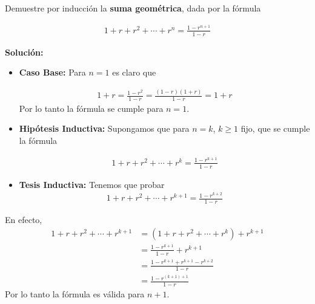 \documentclass[12pt]{book}
\begin{document}
\begin{prob}{}{}
Demuestre por inducción la \textbf{suma geométrica}, dada por la fórmula

\begin{align*}
    1+r+r^2+\cdots+r^n=\frac{1-r^{n+1}}{1-r}
\end{align*}    
\end{prob}
\textbf{Solución:}
\begin{itemize}
    \item \textbf{Caso Base:} Para $n=1$ es claro que 

    \begin{align*}
        1+r=\frac{1-r^2}{1-r}=\frac{(1-r)(1+r)}{1-r}=1+r
    \end{align*}
    Por lo tanto la fórmula se cumple para $n=1$.

    \item \textbf{Hipótesis Inductiva:} Supongamos que para $n=k$, $k \geq 1$ fijo, que se cumple la fórmula 

    \begin{align*}
         1+r+r^2+\cdots+r^k=\frac{1-r^{k+1}}{1-r}
    \end{align*}

    \item \textbf{Tesis Inductiva:} Tenemos que probar 
    \begin{align*}
    1+r+r^2+\cdots+r^{k+1}=\frac{1-r^{k+2}}{1-r}
\end{align*}
\end{itemize}
En efecto,
\begin{align*}
     1+r+r^2+\cdots+r^{k+1}&= (1+r+r^2+\cdots+r^k)+r^{k+1} \\
     &= \frac{1-r^{k+1}}{1-r}+r^{k+1} \\
     &=\frac{1-r^{k+1}+r^{k+1}-r^{k+2}}{1-r}\\
     &=\frac{1-r^{(k+1)+1}}{1-r}
\end{align*}
Por lo tanto la fórmula es válida para $n+1$.
\end{document}
